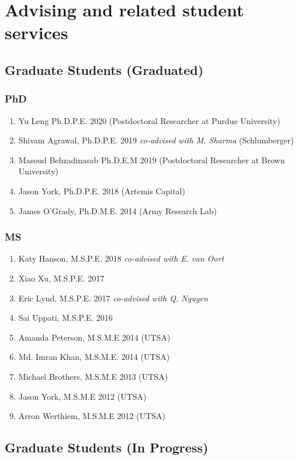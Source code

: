 \section*{Advising and related student services}

\subsection*{Graduate Students (Graduated)}

\subsubsection*{PhD}
\begin{enumerate}
    \item Yu Leng Ph.D.P.E. 2020 (Postdoctoral Researcher at Purdue University)
    \item Shivam Agrawal, Ph.D.P.E. 2019 \emph{co-advised with M. Sharma} (Schlumberger)
    \item Masoud Behzadinasab Ph.D.E.M 2019 (Postdoctoral Researcher at Brown University)
    \item Jason York, Ph.D.P.E. 2018 (Artemis Capital) 
    \item James O'Grady, Ph.D.M.E. 2014 (Army Research Lab)
\end{enumerate}

\subsubsection*{MS}
\begin{enumerate}
    \item Katy Hanson, M.S.P.E. 2018 \emph{co-advised with E. van Oort}
    \item Xiao Xu, M.S.P.E. 2017
    \item Eric Lynd, M.S.P.E. 2017  \emph{co-advised with Q. Nguyen}
    \item Sai Uppati, M.S.P.E. 2016
    \item Amanda Peterson, M.S.M.E 2014 (UTSA)
    \item Md. Imran Khan, M.S.M.E. 2014 (UTSA)
    \item Michael Brothers, M.S.M.E 2013 (UTSA)
    \item Jason York, M.S.M.E 2012 (UTSA)
    \item Arron Werthiem, M.S.M.E 2012 (UTSA)
\end{enumerate}

\subsection*{Graduate Students (In Progress)}

